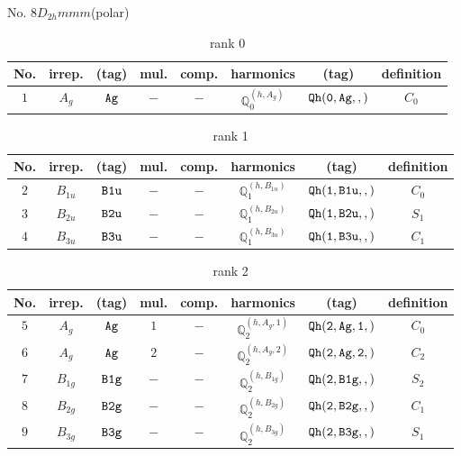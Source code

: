 \documentclass[fleqn,8pt]{jsarticle}
\begin{document}
\setcounter{MaxMatrixCols}{16}

\begin{center}
\LARGE
No. 8\quad$D_{2h}$\quad$mmm$\quad[ orthorhombic ] (polar)
\end{center}
\begin{table}[ht!]
\begin{center}
\caption{rank 0}
\renewcommand{\arraystretch}{1.3}
\begin{tabular}{cccccccc} \hline \hline
No. & irrep. & (tag) & mul. & comp. & harmonics & (tag) & definition \\ \hline
$ 1 $ & $ A_{g} $ & $ {\tt Ag} $ & $ - $ & $ - $ & $ \mathbb{Q}_{0}^{(h,A_{g})} $ & $ {\tt Qh(0,Ag,,)} $ & $ C_{0} $ \\
 \hline \hline
\end{tabular}
\end{center}
\end{table}
\begin{table}[ht!]
\begin{center}
\caption{rank 1}
\renewcommand{\arraystretch}{1.3}
\begin{tabular}{cccccccc} \hline \hline
No. & irrep. & (tag) & mul. & comp. & harmonics & (tag) & definition \\ \hline
$ 2 $ & $ B_{1u} $ & $ {\tt B1u} $ & $ - $ & $ - $ & $ \mathbb{Q}_{1}^{(h,B_{1u})} $ & $ {\tt Qh(1,B1u,,)} $ & $ C_{0} $ \\
$ 3 $ & $ B_{2u} $ & $ {\tt B2u} $ & $ - $ & $ - $ & $ \mathbb{Q}_{1}^{(h,B_{2u})} $ & $ {\tt Qh(1,B2u,,)} $ & $ S_{1} $ \\
$ 4 $ & $ B_{3u} $ & $ {\tt B3u} $ & $ - $ & $ - $ & $ \mathbb{Q}_{1}^{(h,B_{3u})} $ & $ {\tt Qh(1,B3u,,)} $ & $ C_{1} $ \\
 \hline \hline
\end{tabular}
\end{center}
\end{table}
\begin{table}[ht!]
\begin{center}
\caption{rank 2}
\renewcommand{\arraystretch}{1.3}
\begin{tabular}{cccccccc} \hline \hline
No. & irrep. & (tag) & mul. & comp. & harmonics & (tag) & definition \\ \hline
$ 5 $ & $ A_{g} $ & $ {\tt Ag} $ & $ 1 $ & $ - $ & $ \mathbb{Q}_{2}^{(h,A_{g},1)} $ & $ {\tt Qh(2,Ag,1,)} $ & $ C_{0} $ \\
$ 6 $ & $ A_{g} $ & $ {\tt Ag} $ & $ 2 $ & $ - $ & $ \mathbb{Q}_{2}^{(h,A_{g},2)} $ & $ {\tt Qh(2,Ag,2,)} $ & $ C_{2} $ \\
$ 7 $ & $ B_{1g} $ & $ {\tt B1g} $ & $ - $ & $ - $ & $ \mathbb{Q}_{2}^{(h,B_{1g})} $ & $ {\tt Qh(2,B1g,,)} $ & $ S_{2} $ \\
$ 8 $ & $ B_{2g} $ & $ {\tt B2g} $ & $ - $ & $ - $ & $ \mathbb{Q}_{2}^{(h,B_{2g})} $ & $ {\tt Qh(2,B2g,,)} $ & $ C_{1} $ \\
$ 9 $ & $ B_{3g} $ & $ {\tt B3g} $ & $ - $ & $ - $ & $ \mathbb{Q}_{2}^{(h,B_{3g})} $ & $ {\tt Qh(2,B3g,,)} $ & $ S_{1} $ \\
 \hline \hline
\end{tabular}
\end{center}
\end{table}
\end{document}
